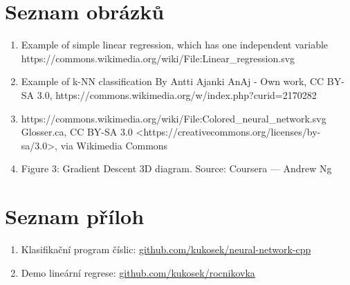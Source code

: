 \documentclass[a4paper,11pt, oneside]{book} \usepackage[czech]{babel}
\begin{document}
	\chapter{Seznam obrázků}

	\begin{enumerate}

		\item Example of simple linear regression, which has one independent variable
	https://commons.wikimedia.org/wiki/File:Linear\_regression.svg

		\item Example of k-NN classification
	By Antti Ajanki AnAj - Own work, CC BY-SA 3.0, https://commons.wikimedia.org/w/index.php?curid=2170282


		\item https://commons.wikimedia.org/wiki/File:Colored\_neural\_network.svg
	Glosser.ca, CC BY-SA 3.0 <https://creativecommons.org/licenses/by-sa/3.0>, via Wikimedia Commons

		\item Figure 3: Gradient Descent 3D diagram. Source: Coursera — Andrew Ng


	\end{enumerate}

	\chapter{Seznam příloh}

	\begin{enumerate}
		\item Klasifikační program číslic:
		\href{https://github.com/kukosek/neural-network-cpp}{github.com/kukosek/neural-network-cpp}

		\item Demo lineární regrese:
		\href{https://github.com/kukosek/rocnikovka}{github.com/kukosek/rocnikovka}
	\end{enumerate}
\end{document}
